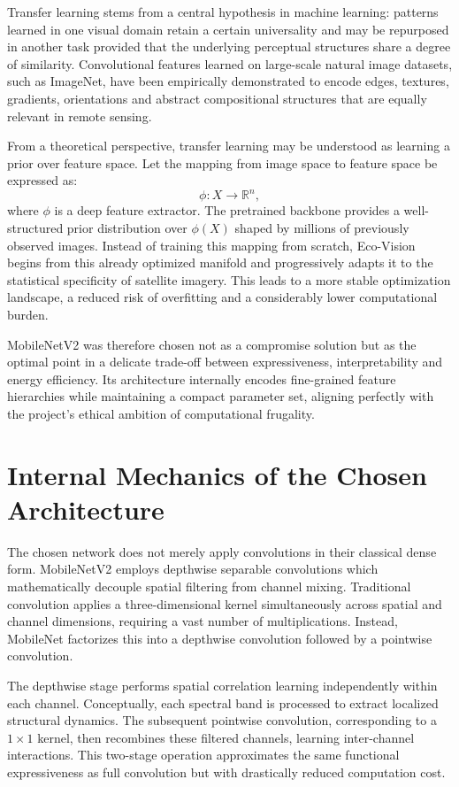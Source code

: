\documentclass[12pt,a4paper]{report}
\begin{document}
Transfer learning stems from a central hypothesis in machine learning: patterns learned in one visual domain retain a certain universality and may be repurposed in another task provided that the underlying perceptual structures share a degree of similarity. Convolutional features learned on large-scale natural image datasets, such as ImageNet, have been empirically demonstrated to encode edges, textures, gradients, orientations and abstract compositional structures that are equally relevant in remote sensing.

From a theoretical perspective, transfer learning may be understood as learning a prior over feature space. Let the mapping from image space to feature space be expressed as:
\[
\phi : X \rightarrow \mathbb{R}^n,
\]
where \(\phi\) is a deep feature extractor. The pretrained backbone provides a well-structured prior distribution over \(\phi(X)\) shaped by millions of previously observed images. Instead of training this mapping from scratch, Eco-Vision begins from this already optimized manifold and progressively adapts it to the statistical specificity of satellite imagery. This leads to a more stable optimization landscape, a reduced risk of overfitting and a considerably lower computational burden.

MobileNetV2 was therefore chosen not as a compromise solution but as the optimal point in a delicate trade-off between expressiveness, interpretability and energy efficiency. Its architecture internally encodes fine-grained feature hierarchies while maintaining a compact parameter set, aligning perfectly with the project's ethical ambition of computational frugality.

\section{Internal Mechanics of the Chosen Architecture}

The chosen network does not merely apply convolutions in their classical dense form. MobileNetV2 employs depthwise separable convolutions which mathematically decouple spatial filtering from channel mixing. Traditional convolution applies a three-dimensional kernel simultaneously across spatial and channel dimensions, requiring a vast number of multiplications. Instead, MobileNet factorizes this into a depthwise convolution followed by a pointwise convolution. 

The depthwise stage performs spatial correlation learning independently within each channel. Conceptually, each spectral band is processed to extract localized structural dynamics. The subsequent pointwise convolution, corresponding to a \(1 \times 1\) kernel, then recombines these filtered channels, learning inter-channel interactions. This two-stage operation approximates the same functional expressiveness as full convolution but with drastically reduced computation cost.
\end{document}
